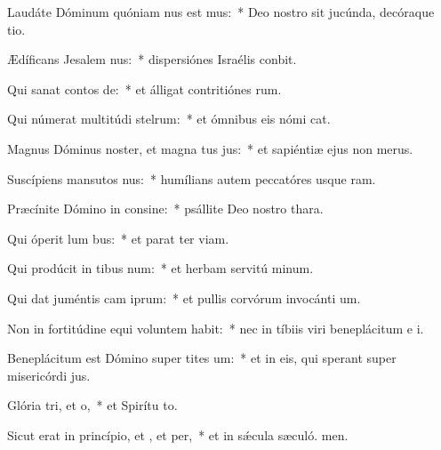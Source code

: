\item Laudáte Dóminum quóniam nus est mus:~* Deo nostro sit jucúnda, decóraque tio.
\item Ædíficans Jesalem nus:~* dispersiónes Israélis conbit.
\item Qui sanat contos de:~* et álligat contritiónes rum.
\item Qui númerat multitúdi stelrum:~* et ómnibus eis nómi cat.
\item Magnus Dóminus noster, et magna tus jus:~* et sapiéntiæ ejus non  merus.
\item Suscípiens mansutos nus:~* humílians autem peccatóres usque  ram.
\item Præcínite Dómino in consine:~* psállite Deo nostro  thara.
\item Qui óperit lum bus:~* et parat ter viam.
\item Qui prodúcit in tibus num:~* et herbam servitú minum.
\item Qui dat juméntis cam iprum:~* et pullis corvórum invocánti um.
\item Non in fortitúdine equi voluntem habit:~* nec in tíbiis viri beneplácitum e i.
\item Beneplácitum est Dómino super tites um:~* et in eis, qui sperant super misericórdi jus.
\item Glória tri, et o,~* et Spirítu to.
\item Sicut erat in princípio, et , et per,~* et in sǽcula sæculó. men.
